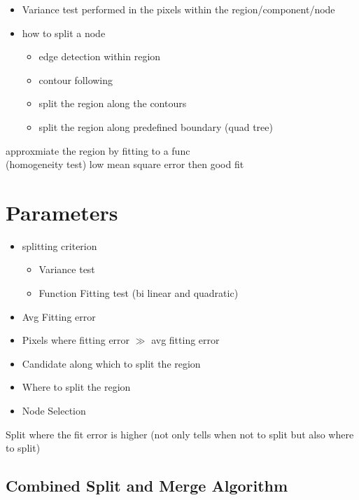 \documentclass[11pt]{article}
\theoremstyle{definition}
\begin{document}
\begin{itemize}
    \item Variance test performed in the pixels within the region/component/node
    
    \item how to split a node
    \begin{itemize}
        \item edge detection within region
        \item contour following
        \item split the region along the contours
        \item split the region along predefined boundary (quad tree)
    \end{itemize}
\end{itemize}

approxmiate the region by fitting to a func \\
(homogeneity test) low mean square error then good fit


\section*{Parameters}

\begin{itemize}
    \item splitting criterion
    \begin{itemize}
        \item[-] Variance test
        \item[-] Function Fitting test (bi linear and quadratic)
    \end{itemize}
    
    \item Avg Fitting error
    \item Pixels where fitting error $\gg$ avg fitting error
    \item[-] Candidate along which to split the region
    \item[-] Where to split the region
    \item[-] Node Selection
\end{itemize}

Split where the fit error is higher (not only tells when not to split but also where to split)


\subsection*{Combined Split and Merge Algorithm}
\end{document}
